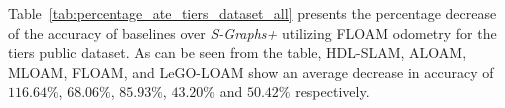 Table~\ref{tab:percentage_ate_tiers_dataset_all} presents the percentage decrease of the accuracy of baselines over \textit{S-Graphs+} utilizing FLOAM odometry for the tiers public dataset. As can be seen from the table, HDL-SLAM, ALOAM, MLOAM, FLOAM, and LeGO-LOAM show an average decrease in accuracy of $116.64\%$, $68.06\%$, $85.93\%$, $43.20\%$ and $50.42\%$ respectively. 